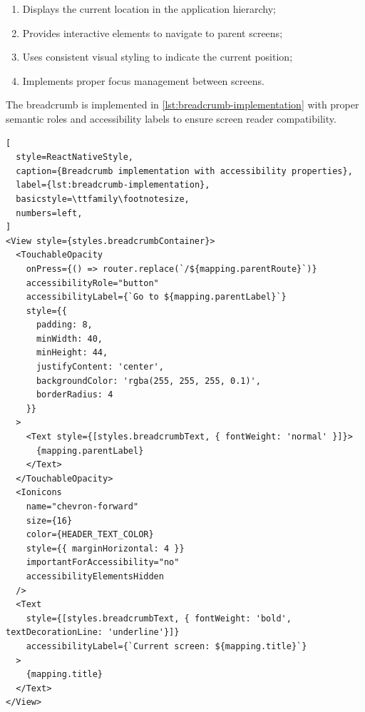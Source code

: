 \begin{enumerate}
    \item Displays the current location in the application hierarchy;
    \item Provides interactive elements to navigate to parent screens;
    \item Uses consistent visual styling to indicate the current position;
    \item Implements proper focus management between screens.
\end{enumerate}

The breadcrumb is implemented in \ref{lst:breadcrumb-implementation} with proper semantic roles and accessibility labels to ensure screen reader compatibility.

\begin{lstlisting}[
  style=ReactNativeStyle,
  caption={Breadcrumb implementation with accessibility properties},
  label={lst:breadcrumb-implementation},
  basicstyle=\ttfamily\footnotesize,
  numbers=left,
]
<View style={styles.breadcrumbContainer}>
  <TouchableOpacity
    onPress={() => router.replace(`/${mapping.parentRoute}`)}
    accessibilityRole="button"
    accessibilityLabel={`Go to ${mapping.parentLabel}`}
    style={{
      padding: 8,
      minWidth: 40,
      minHeight: 44,
      justifyContent: 'center',
      backgroundColor: 'rgba(255, 255, 255, 0.1)',
      borderRadius: 4
    }}
  >
    <Text style={[styles.breadcrumbText, { fontWeight: 'normal' }]}>
      {mapping.parentLabel}
    </Text>
  </TouchableOpacity>
  <Ionicons
    name="chevron-forward"
    size={16}
    color={HEADER_TEXT_COLOR}
    style={{ marginHorizontal: 4 }}
    importantForAccessibility="no"
    accessibilityElementsHidden
  />
  <Text
    style={[styles.breadcrumbText, { fontWeight: 'bold', textDecorationLine: 'underline'}]}
    accessibilityLabel={`Current screen: ${mapping.title}`}
  >
    {mapping.title}
  </Text>
</View>
\end{lstlisting}

